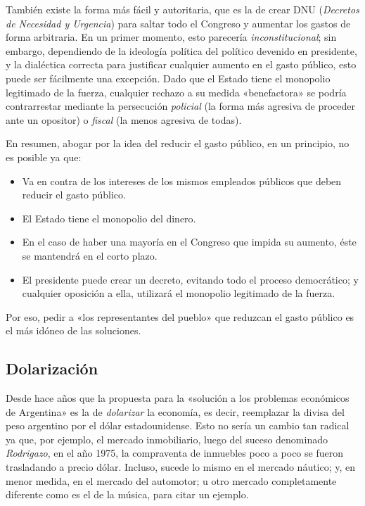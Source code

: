 \documentclass[12pt,a4paper,twoside]{book}
\begin{document}
También existe la forma más fácil y autoritaria, que es la de crear DNU (\textit{Decretos de Necesidad y Urgencia}) para saltar todo el Congreso y aumentar los gastos de forma arbitraria. En un primer momento, esto parecería \textit{inconstitucional}; sin embargo, dependiendo de la ideología política del político devenido en presidente, y la dialéctica correcta para justificar cualquier aumento en el gasto público, esto puede ser fácilmente una excepción. Dado que el Estado tiene el monopolio legitimado de la fuerza, cualquier rechazo a su medida «benefactora» se podría contrarrestar mediante la persecución \textit{policial} (la forma más agresiva de proceder ante un opositor) o \textit{fiscal} (la menos agresiva de todas).

En resumen, abogar por la idea del reducir el gasto público, en un principio, no es posible ya que:

\begin{itemize}
\item Va en contra de los intereses de los mismos empleados públicos que deben reducir el gasto público.
\item El Estado tiene el monopolio del dinero.
\item En el caso de haber una mayoría en el Congreso que impida su aumento, éste se mantendrá en el corto plazo.
\item El presidente puede crear un decreto, evitando todo el proceso democrático; y cualquier oposición a ella, utilizará el monopolio legitimado de la fuerza.
\end{itemize}

Por eso, pedir a «los representantes del pueblo» que reduzcan el gasto público es el más idóneo de las soluciones.

\subsection{Dolarización}
Desde hace años que la propuesta para la «solución a los problemas económicos de Argentina» es la de \textit{dolarizar} la economía, es decir, reemplazar la divisa del peso argentino por el dólar estadounidense. Esto no sería un cambio tan radical ya que, por ejemplo, el mercado inmobiliario, luego del suceso denominado \textit{Rodrigazo}, en el año 1975, la compraventa de inmuebles poco a poco se fueron trasladando a precio dólar. Incluso, sucede lo mismo en el mercado náutico; y, en menor medida, en el mercado del automotor; u otro mercado completamente diferente como es el de la música, para citar un ejemplo.
\end{document}
